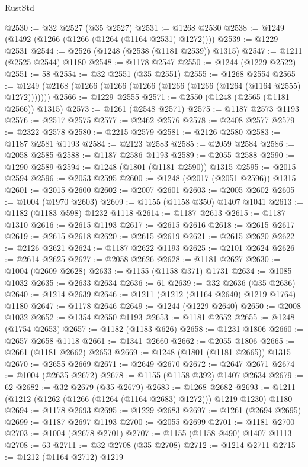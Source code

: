 \begin{lexlean}{RustStd}
\begin{coremodule}
{\begin{coremodule}
{{{{{{{{{{{{{{{{{{{{{{{{{{{{{{{{@2530 := @32 @2527 (@35 @2527)
@2531 := @1268 @2530
@2538 := @1249 (@1492 (@1266 (@1266 (@1264 (@1164 @2531) @1272))))
@2539 := @1229 @2531
@2544 := @2526 (@1248 (@2538 (@1181 @2539)) @1315)
@2547 := @1211 (@2525 @2544) @1180
@2548 := @1178 @2547
@2550 := @1244 (@1229 @2522)
@2551 := 58
@2554 := @32 @2551 (@35 @2551)
@2555 := @1268 @2554
@2565 := @1249 (@2168 (@1266 (@1266 (@1266 (@1266 (@1266 (@1264 (@1164 @2555) @1272)))))))
@2566 := @1229 @2555
@2571 := @2550 (@1248 (@2565 (@1181 @2566)) @1315)
@2573 := @1261 (@2548 @2571)
@2575 := @1187 @2573 @1193
@2576 := @2517 @2575
@2577 := @2462 @2576
@2578 := @2408 @2577
@2579 := @2322 @2578
@2580 := @2215 @2579
@2581 := @2126 @2580
@2583 := @1187 @2581 @1193
@2584 := @2123 @2583
@2585 := @2059 @2584
@2586 := @2058 @2585
@2588 := @1187 @2586 @1193
@2589 := @2055 @2588
@2590 := @1290 @2589
@2594 := @1248 (@1801 (@1181 @2590)) @1315
@2595 := @2015 @2594
@2596 := @2053 @2595
@2600 := @1248 (@2017 (@2051 @2596)) @1315
@2601 := @2015 @2600
@2602 := @2007 @2601
@2603 := @2005 @2602
@2605 := @1004 (@1970 @2603)
@2609 := @1155 (@1158 @350) @1407 @1041
@2613 := @1182 (@1183 @598) @1232 @1118
@2614 := @1187 @2613
@2615 := @1187 @1310
@2616 := @2615 @1193
@2617 := @2615 @2616
@2618 := @2615 @2617
@2619 := @2615 @2618
@2620 := @2615 @2619
@2621 := @2615 @2620
@2622 := @2126 @2621
@2624 := @1187 @2622 @1193
@2625 := @2101 @2624
@2626 := @2614 @2625
@2627 := @2058 @2626
@2628 := @1181 @2627
@2630 := @1004 (@2609 @2628)
@2633 := @1155 (@1158 @371) @1731
@2634 := @1085 @1032
@2635 := @2633 @2634
@2636 := 61
@2639 := @32 @2636 (@35 @2636)
@2640 := @1214 @2639
@2646 := @1211 (@1212 (@1164 @2640) @1219 @1764) @1180
@2647 := @1178 @2646
@2649 := @1244 (@1229 @2640)
@2650 := @2008 @1032
@2652 := @1354 @2650 @1193
@2653 := @1181 @2652
@2655 := @1248 (@1754 @2653)
@2657 := @1182 (@1183 @626)
@2658 := @1231 @1806
@2660 := @2657 @2658 @1118
@2661 := @1341 @2660
@2662 := @2055 @1806
@2665 := @2661 (@1181 @2662) @2653
@2669 := @1248 (@1801 (@1181 @2665)) @1315
@2670 := @2655 @2669
@2671 := @2649 @2670
@2672 := @2647 @2671
@2674 := @1004 (@2635 @2672)
@2678 := @1155 (@1158 @392) @1407 @2634
@2679 := 62
@2682 := @32 @2679 (@35 @2679)
@2683 := @1268 @2682
@2693 := @1211 (@1212 (@1262 (@1266 (@1264 (@1164 @2683) @1272))) @1219 @1230) @1180
@2694 := @1178 @2693
@2695 := @1229 @2683
@2697 := @1261 (@2694 @2695)
@2699 := @1187 @2697 @1193
@2700 := @2055 @2699
@2701 := @1181 @2700
@2703 := @1004 (@2678 @2701)
@2707 := @1155 (@1158 @490) @1407 @1113
@2708 := 63
@2711 := @32 @2708 (@35 @2708)
@2712 := @1214 @2711
@2715 := @1212 (@1164 @2712) @1219
}}}}}}}}}}}}}}}}}}}}}}}}}}}}}}}}
\end{coremodule}}
\end{coremodule}
\end{lexlean}
